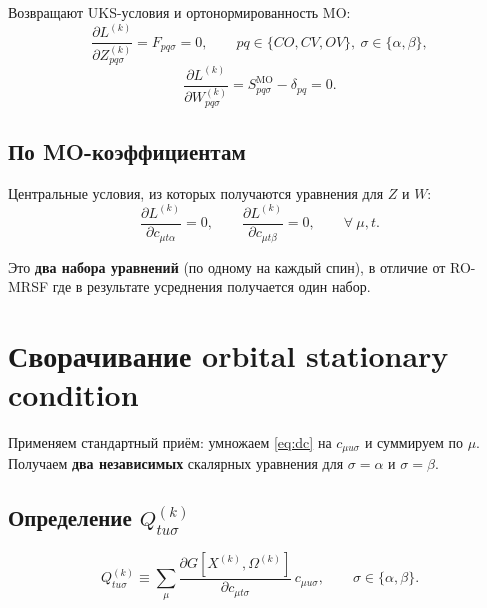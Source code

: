 \documentclass[11pt, a4paper]{article}
\theoremstyle{definition}
\newcommand{\Xk}[2]{X^{(#1)}_{#2}}
\newcommand{\Zk}[2]{Z^{(#1)}_{#2}}
\newcommand{\Wk}[2]{W^{(#1)}_{#2}}
\newcommand{\MO}{\text{MO}}
\begin{document}
Возвращают UKS-условия и ортонормированность MO:
\begin{equation}
    \frac{\partial L^{(k)}}{\partial \Zk{k}{pq\sigma}} = F_{pq\sigma} = 0, \qquad pq \in \{CO, CV, OV\},\ \sigma \in \{\alpha, \beta\},
    \label{eq:dZ}
\end{equation}
\begin{equation}
    \frac{\partial L^{(k)}}{\partial \Wk{k}{pq\sigma}} = S^{\MO}_{pq\sigma} - \delta_{pq} = 0.
    \label{eq:dW}
\end{equation}

\subsection{По MO-коэффициентам}

Центральные условия, из которых получаются уравнения для $Z$ и $W$:
\begin{equation}
    \frac{\partial L^{(k)}}{\partial c_{\mu t \alpha}} = 0, \qquad \frac{\partial L^{(k)}}{\partial c_{\mu t \beta}} = 0, \qquad \forall\ \mu, t.
    \label{eq:dc}
\end{equation}

Это \textbf{два набора уравнений} (по одному на каждый спин), в отличие от RO-MRSF где в результате усреднения получается один набор.

\section{Сворачивание orbital stationary condition}
\label{sec:folding}

Применяем стандартный приём: умножаем \eqref{eq:dc} на $c_{\mu u \sigma}$ и суммируем по $\mu$. Получаем \textbf{два независимых} скалярных уравнения для $\sigma = \alpha$ и $\sigma = \beta$.

\subsection{Определение $Q^{(k)}_{tu\sigma}$}

\begin{equation}
    \boxed{\;
    Q^{(k)}_{tu\sigma} \equiv \sum_\mu \frac{\partial G[\Xk{k}{}, \Omega^{(k)}]}{\partial c_{\mu t \sigma}}\, c_{\mu u \sigma}, \qquad \sigma \in \{\alpha, \beta\}.
    \;}
    \label{eq:Qdef}
\end{equation}
\end{document}

